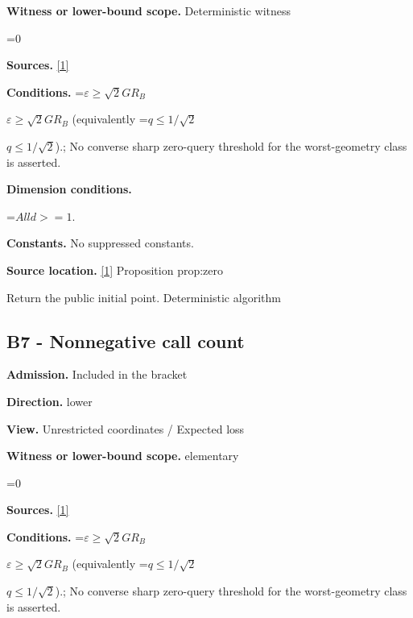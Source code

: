 \documentclass[10pt,a4paper]{article}
\newcommand{\AtlasMath}[1]{\par\begingroup\centering\setbox0=\hbox{$\displaystyle #1$}\ifdim\wd0>1.4\linewidth\typeout{ATLAS WIDE FORMULA: \the\wd0}\fi\ifdim\wd0>\linewidth\resizebox{\linewidth}{!}{\box0}\else\box0\fi\par\endgroup}
\newcommand{\AtlasInlineMath}[1]{\begingroup\setbox0=\hbox{$#1$}\ifdim\wd0>.4\linewidth\endgroup\AtlasMath{#1}\else\endgroup$#1$\fi}
\begin{document}
\textbf{Witness or lower-bound scope.} Deterministic witness



\AtlasMath{0}


\textbf{Sources.} \href{https://github.com/WU-Wendao/Colombo/blob/main/colombo_sensorium/Complexity_altas/data/sources/colombo/U03/manuscript.pdf}{[1]}



\textbf{Conditions.} \AtlasInlineMath{\varepsilon\ge\sqrt2GR_B} (equivalently \AtlasInlineMath{q\le1/\sqrt2}).; No converse sharp zero-query threshold for the worst-geometry class is asserted.



\textbf{Dimension conditions.}



\AtlasMath{All d>=1.}


\textbf{Constants.} No suppressed constants.



\textbf{Source location.} \href{https://github.com/WU-Wendao/Colombo/blob/main/colombo_sensorium/Complexity_altas/data/sources/colombo/U03/manuscript.pdf}{[1]} Proposition prop:zero



Return the public initial point. Deterministic algorithm



\subsection{B7 - Nonnegative call count}


\textbf{Admission.} Included in the bracket



\textbf{Direction.} lower



\textbf{View.} Unrestricted coordinates / Expected loss



\textbf{Witness or lower-bound scope.} elementary



\AtlasMath{0}


\textbf{Sources.} \href{https://github.com/WU-Wendao/Colombo/blob/main/colombo_sensorium/Complexity_altas/data/sources/colombo/U03/manuscript.pdf}{[1]}



\textbf{Conditions.} \AtlasInlineMath{\varepsilon\ge\sqrt2GR_B} (equivalently \AtlasInlineMath{q\le1/\sqrt2}).; No converse sharp zero-query threshold for the worst-geometry class is asserted.
\end{document}
